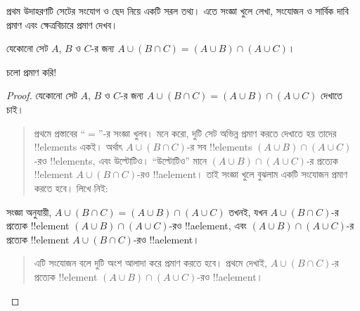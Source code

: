 \documentclass[../../../include/open-logic-section]{subfiles}
\begin{document}


প্রথম উদাহরণটি সেটের সংযোগ ও ছেদ নিয়ে একটি সরল
তথ্য। এতে সংজ্ঞা খুলে লেখা, সংযোজন ও সার্বিক
দাবি প্রমাণ এবং ক্ষেত্রবিচারে প্রমাণ দেখব।

\begin{prop}
যেকোনো সেট $A$, $B$ ও $C$-র জন্য
$A \cup (B \cap C) = (A \cup B)
\cap (A \cup C)$।
\end{prop}

চলো প্রমাণ করি!{}

\begin{proof}
যেকোনো সেট $A$, $B$ ও $C$-র জন্য
$A \cup (B \cap C) = (A \cup B) \cap (A \cup C)$
দেখাতে চাই।
\begin{quote}
প্রথমে প্রস্তাবের ``$=$''-র সংজ্ঞা খুলব। মনে করো,
দুটি সেট অভিন্ন প্রমাণ করতে দেখাতে হয় তাদের
!!{element}s একই। অর্থাৎ $A \cup (B \cap C)$-র
সব !!{element}s $(A \cup B) \cap (A \cup C)$-রও
!!{element}s, এবং উল্টোটিও। ``উল্টোটিও'' মানে
$(A \cup B) \cap (A \cup C)$-র প্রত্যেক
!!{element} $A \cup (B \cap C)$-রও
!!a{element}। তাই সংজ্ঞা খুলে বুঝলাম একটি
সংযোজন প্রমাণ করতে হবে। লিখে নিই:
\end{quote}
সংজ্ঞা অনুযায়ী, $A \cup (B \cap C) = (A \cup B)
\cap (A \cup C)$ তখনই, যখন $A \cup (B \cap C)$-র
প্রত্যেক !!{element} $(A \cup B) \cap (A \cup C)$-রও
!!a{element}, এবং $(A \cup B) \cap (A \cup C)$-র
প্রত্যেক !!{element} $A \cup (B \cap C)$-রও
!!a{element}।
\begin{quote}
এটি সংযোজন বলে দুটি অংশ আলাদা করে প্রমাণ
করতে হবে। প্রথমে দেখাই, $A \cup (B \cap C)$-র
প্রত্যেক !!{element} $(A \cup B) \cap (A \cup C)$-রও
!!a{element}।


\end{quote}
\end{proof}
\end{document}
